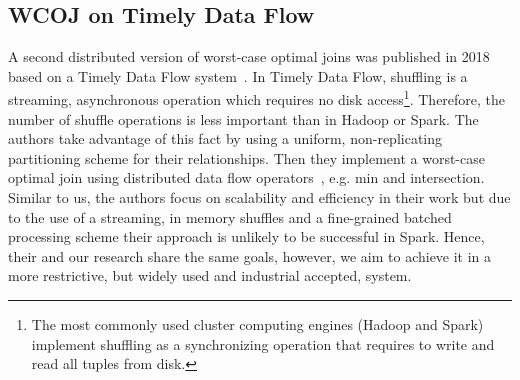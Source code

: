 \subsection{\textsc{WCOJ} on Timely Data Flow}
A second distributed version of worst-case optimal joins was published in 2018 based on a Timely Data Flow system~\cite{ammar2018distributed,naiad}.
In Timely Data Flow, shuffling is a streaming, asynchronous operation which requires no disk access\footnote{The most commonly used cluster computing engines (Hadoop and Spark) implement shuffling as a synchronizing operation that requires to write and read all tuples from disk.}.
Therefore, the number of shuffle operations is less important than in Hadoop or Spark.
The authors take advantage of this fact by using a uniform, non-replicating partitioning scheme for their relationships.
Then they implement a worst-case optimal join using distributed data flow operators~\cite{naiad}, e.g. min and intersection.
Similar to us, the authors focus on scalability and efficiency in their work but due to the use of a streaming, in memory shuffles and a fine-grained batched processing scheme their approach is unlikely to be successful in Spark.
Hence, their and our research share the same goals, however, we aim to achieve it in a more restrictive, but widely used and industrial accepted, system.





